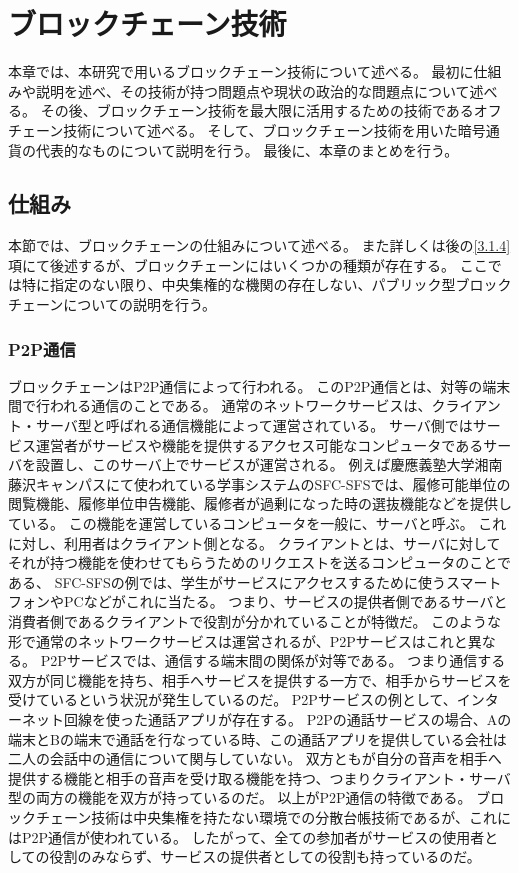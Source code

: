 \chapter{ブロックチェーン技術}
本章では、本研究で用いるブロックチェーン技術について述べる。
最初に仕組みや説明を述べ、その技術が持つ問題点や現状の政治的な問題点について述べる。
その後、ブロックチェーン技術を最大限に活用するための技術であるオフチェーン技術について述べる。
そして、ブロックチェーン技術を用いた暗号通貨の代表的なものについて説明を行う。
最後に、本章のまとめを行う。

\section{仕組み}
本節では、ブロックチェーンの仕組みについて述べる。
また詳しくは後の\ref{3.1.4}項にて後述するが、ブロックチェーンにはいくつかの種類が存在する。
ここでは特に指定のない限り、中央集権的な機関の存在しない、パブリック型ブロックチェーンについての説明を行う。

\subsection{P2P通信}
ブロックチェーンはP2P通信によって行われる。
このP2P通信とは、対等の端末間で行われる通信のことである。
通常のネットワークサービスは、クライアント・サーバ型と呼ばれる通信機能によって運営されている。
サーバ側ではサービス運営者がサービスや機能を提供するアクセス可能なコンピュータであるサーバを設置し、このサーバ上でサービスが運営される。
例えば慶應義塾大学湘南藤沢キャンパスにて使われている学事システムのSFC-SFSでは、履修可能単位の閲覧機能、履修単位申告機能、履修者が過剰になった時の選抜機能などを提供している。
この機能を運営しているコンピュータを一般に、サーバと呼ぶ。
これに対し、利用者はクライアント側となる。
クライアントとは、サーバに対してそれが持つ機能を使わせてもらうためのリクエストを送るコンピュータのことである、
SFC-SFSの例では、学生がサービスにアクセスするために使うスマートフォンやPCなどがこれに当たる。
つまり、サービスの提供者側であるサーバと消費者側であるクライアントで役割が分かれていることが特徴だ。
このような形で通常のネットワークサービスは運営されるが、P2Pサービスはこれと異なる。
P2Pサービスでは、通信する端末間の関係が対等である。
つまり通信する双方が同じ機能を持ち、相手へサービスを提供する一方で、相手からサービスを受けているという状況が発生しているのだ。
P2Pサービスの例として、インターネット回線を使った通話アプリが存在する。
P2Pの通話サービスの場合、Aの端末とBの端末で通話を行なっている時、この通話アプリを提供している会社は二人の会話中の通信について関与していない。
双方ともが自分の音声を相手へ提供する機能と相手の音声を受け取る機能を持つ、つまりクライアント・サーバ型の両方の機能を双方が持っているのだ。
以上がP2P通信の特徴である。
ブロックチェーン技術は中央集権を持たない環境での分散台帳技術であるが、これにはP2P通信が使われている。
したがって、全ての参加者がサービスの使用者としての役割のみならず、サービスの提供者としての役割も持っているのだ。

